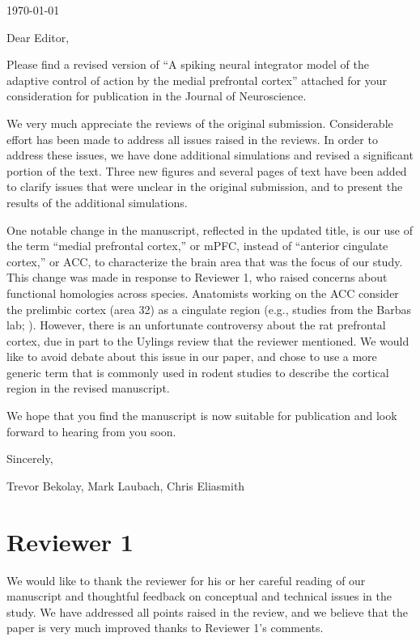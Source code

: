 \documentclass[11pt,paper=letter]{scrartcl}
\begin{document}
\vspace*{1.5\baselineskip}
\begin{flushright}
  \today
\end{flushright}

Dear Editor,

Please find a revised version of
``A spiking neural integrator model of the adaptive
control of action by the medial prefrontal cortex''
attached for your consideration for publication in the
Journal of Neuroscience.

We very much appreciate the reviews
of the original submission.
Considerable effort has been made to address
all issues raised in the reviews.
In order to address these issues,
we have done additional simulations
and revised a significant portion of the text.
Three new figures and several pages
of text have been added
to clarify issues that were unclear
in the original submission,
and to present the results
of the additional simulations.

One notable change in the manuscript,
reflected in the updated title,
is our use of the term ``medial prefrontal cortex,''
or mPFC, instead of ``anterior cingulate cortex,''
or ACC, to characterize the brain area
that was the focus of our study.
This change was made in response to
Reviewer 1, who raised concerns
about functional homologies across species.
Anatomists working on the ACC
consider the prelimbic cortex
(area 32) as a cingulate region
(e.g., studies from the Barbas lab;
).
However, there is an unfortunate controversy
about the rat prefrontal cortex,
due in part to the Uylings review
that the reviewer mentioned.
We would like to avoid debate
about this issue in our paper,
and chose to use a more generic term
that is commonly used in rodent studies
to describe the cortical region
in the revised manuscript.

We hope that you find the manuscript
is now suitable for publication
and look forward to hearing from you soon.

Sincerely, \vspace{1em}

Trevor Bekolay, Mark Laubach, Chris Eliasmith

\clearpage
\setlength{\parindent}{1cm}
\setlength{\parskip}{3pt}

\section*{Reviewer 1}

We would like to thank the reviewer for his or her
careful reading of our manuscript
and thoughtful feedback on conceptual
and technical issues in the study.
We have addressed all points raised
in the review,
and we believe that the paper
is very much improved thanks
to Reviewer 1's comments.
\end{document}
